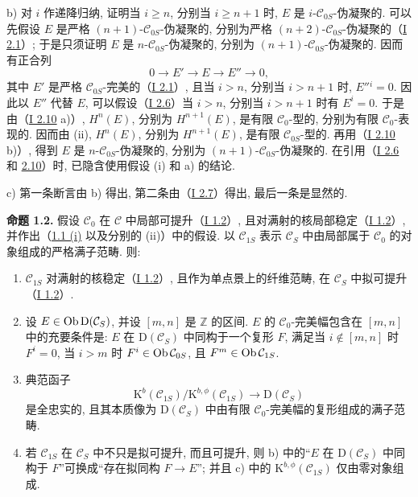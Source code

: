 b) 对 $i$ 作递降归纳, 证明当 $i\ge n$, 分别当 $i\ge n+1$ 时, $E$ 是 $i$-$\mathcal C_{0S}$-伪凝聚的. 可以先假设 $E$ 是严格 $(n+1)$-$\mathcal C_{0S}$-伪凝聚的, 分别为严格 $(n+2)$-$\mathcal C_{0S}$-伪凝聚的（\hyperlink{sga6.e01.def.2-1}{I 2.1}）; 于是只须证明 $E$ 是 $n$-$\mathcal C_{0S}$-伪凝聚的, 分别为 $(n+1)$-$\mathcal C_{0S}$-伪凝聚的. 因而有正合列
\[
0\longrightarrow E'\longrightarrow E\longrightarrow E''\longrightarrow0,
\]
其中 $E'$ 是严格 $\mathcal C_{0S}$-完美的（\hyperlink{sga6.e01.def.2-1}{I 2.1}）, 且当 $i>n$, 分别当 $i>n+1$ 时, $E''{}^i=0$. 因此以 $E''$ 代替 $E$, 可以假设（\hyperlink{sga6.e01.schol.2-6}{I 2.6}）当 $i>n$, 分别当 $i>n+1$ 时有 $E^i=0$. 于是由（\hyperlink{sga6.e01.prop.2-10}{I 2.10} a)）, $H^n(E)$, 分别为 $H^{n+1}(E)$, 是有限 $\mathcal C_0$-型的, 分别为有限 $\mathcal C_0$-表现的. 因而由 (ii), $H^n(E)$, 分别为 $H^{n+1}(E)$, 是有限 $\mathcal C_{0S}$-型的. 再用（\hyperlink{sga6.e01.prop.2-10}{I 2.10} b)）, 得到 $E$ 是 $n$-$\mathcal C_{0S}$-伪凝聚的, 分别为 $(n+1)$-$\mathcal C_{0S}$-伪凝聚的. 在引用（\hyperlink{sga6.e01.schol.2-6}{I 2.6} 和 \hyperlink{sga6.e01.prop.2-10}{2.10}）时, 已隐含使用假设 (i) 和 a) 的结论.

c) 第一条断言由 b) 得出, 第二条由（\hyperlink{sga6.e01.prop.2-7}{I 2.7}）得出, 最后一条是显然的.

\textbf{命题 1.2.} 假设 $\mathcal C_0$ 在 $\mathcal C$ 中局部可提升（\hyperlink{sga6.e01.sec.1.2}{I 1.2}）, 且对满射的核局部稳定（\hyperlink{sga6.e01.sec.1.2}{I 1.2}）, 并作出（\hyperlink{sga6.e02.prop.1-1}{1.1 (i)} 以及分别的 (ii)）中的假设. 以 $\mathcal C_{1S}$ 表示 $\mathcal C_S$ 中由局部属于 $\mathcal C_0$ 的对象组成的严格满子范畴. 则:
\begin{enumerate}[label=\alph*)]
\item $\mathcal C_{1S}$ 对满射的核稳定（\hyperlink{sga6.e01.sec.1.2}{I 1.2}）, 且作为单点景上的纤维范畴, 在 $\mathcal C_S$ 中拟可提升（\hyperlink{sga6.e01.sec.1.2}{I 1.2}）.
\item 设 $E\in\operatorname{Ob}\mathrm D(\mathcal C_S)$, 并设 $[m,n]$ 是 $\mathbb Z$ 的区间. $E$ 的 $\mathcal C_0$-完美幅包含在 $[m,n]$ 中的充要条件是: $E$ 在 $\mathrm D(\mathcal C_S)$ 中同构于一个复形 $F$, 满足当 $i\notin[m,n]$ 时 $F^i=0$, 当 $i>m$ 时 $F^i\in\operatorname{Ob}\mathcal C_{0S}$, 且 $F^m\in\operatorname{Ob}\mathcal C_{1S}$.
\item 典范函子
\[
\mathrm K^b(\mathcal C_{1S})/\mathrm K^{b,\phi}(\mathcal C_{1S})
\longrightarrow \mathrm D(\mathcal C_S)
\]
是全忠实的, 且其本质像为 $\mathrm D(\mathcal C_S)$ 中由有限 $\mathcal C_0$-完美幅的复形组成的满子范畴.
\item 若 $\mathcal C_{1S}$ 在 $\mathcal C_S$ 中不只是拟可提升, 而且可提升, 则 b) 中的“$E$ 在 $\mathrm D(\mathcal C_S)$ 中同构于 $F$”可换成“存在拟同构 $F\to E$”; 并且 c) 中的 $\mathrm K^{b,\phi}(\mathcal C_{1S})$ 仅由零对象组成.
\end{enumerate}

